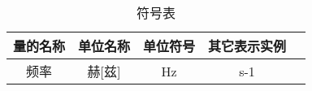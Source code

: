 
\begin{denotation}
  \begin{table}[h]
  \caption{符号表}
  \vspace{0.5em}\centering\wuhao
  \begin{tabular}{ccccc}
    \toprule[1.5pt]
    量的名称&单位名称&单位符号&其它表示实例\\
    \midrule[1pt]
    频率&赫[兹]&Hz&s-1\\
    \bottomrule[1.5pt]
    \end{tabular}
  \end{table}
\end{denotation}
